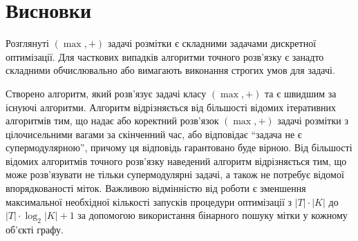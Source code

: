 \chapter*{Висновки}

Розглянуті $(\max,+)$ задачі розмітки є складними задачами дискретної оптимізації.
Для часткових випадків алгоритми точного розв'язку є занадто складними
обчислювально або вимагають виконання строгих умов для задачі.

Створено алгоритм, який розв'язує задачі класу
$(\max,+)$ та є швидшим за існуючі алгоритми.
Алгоритм відрізняється від більшості відомих ітеративних алгоритмів тим,
що надає або коректний розв'язок $(\max, +)$ задачі розмітки з цілочисельними вагами
за скінченний час, або відповідає ``задача не є супермодулярною'',
причому ця відповідь гарантовано буде вірною.
Від більшості відомих алгоритмів точного розв'язку
наведений алгоритм відрізняється тим,
що може розв'язувати не тільки супермодулярні задачі,
а також не потребує відомої впорядкованості міток.
Важливою відмінністю від роботи \cite{diffusion_shlezinger}
є зменшення максимальної необхідної кількості
запусків процедури оптимізації з $|T|\cdot|K|$ до $|T|\cdot \log_2 |K| + 1$
за допомогою використання бінарного пошуку мітки у кожному об'єкті графу.
